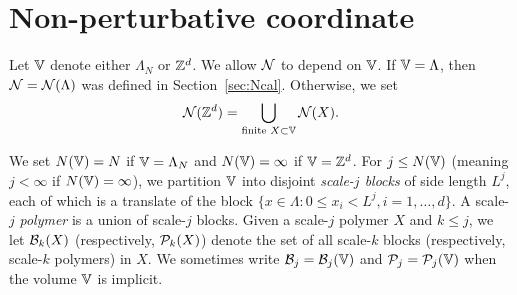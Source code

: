 
\section{Non-perturbative coordinate}
\label{sec:rgcoord}

Let $\mathbb{V}$ denote either $\Lambda_N$ or ${ {{\mathbb Z}}^d }$. We allow $\mathcal{N}$ to depend on
$\mathbb{V}$. If $\mathbb{V} = \Lambda$, then $\mathcal{N} = \mathcal{N}(\Lambda)$ was defined in
Section~\ref{sec:Ncal}. Otherwise, we set
\begin{equation}
\mathcal{N}({ {{\mathbb Z}}^d }) = \bigcup_{\text{finite } X \subset \mathbb{V}} \mathcal{N}(X).
\end{equation}

We set $N(\mathbb{V}) = N$ if
$\mathbb{V} = \Lambda_N$ and $N(\mathbb{V}) = \infty$ if $\mathbb{V} = { {{\mathbb Z}}^d }$.
For $j \le N(\mathbb{V})$ (meaning $j < \infty$ if $N(\mathbb{V}) = \infty$), we partition
$\mathbb{V}$ into disjoint
\emph{scale-$j$ blocks} of side length $L^j$, each of which is a translate of
the block $\{ x \in \Lambda : 0 \le x_i < L^j, i = 1, \ldots, d\}$.
A scale-$j$ \emph{polymer} is a union of scale-$j$ blocks.
Given a scale-$j$ polymer $X$ and $k \le j$, we let $\mathcal{B}_k(X)$
(respectively, $\mathcal{P}_k(X)$)
denote the set of all scale-$k$ blocks (respectively, scale-$k$ polymers) in $X$.
We sometimes write $\mathcal{B}_j = \mathcal{B}_j(\mathbb{V})$ and $\mathcal{P}_j = \mathcal{P}_j(\mathbb{V})$
when the volume $\mathbb{V}$ is implicit.

